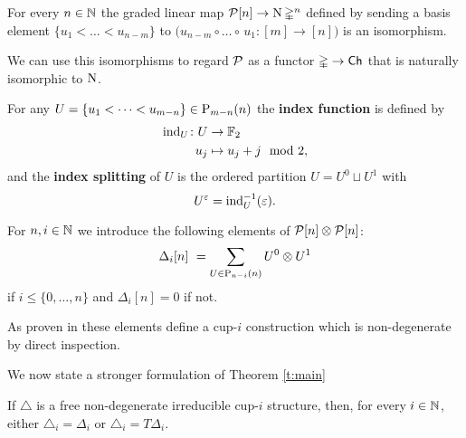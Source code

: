 \begin{lemma}
	For every $n \in \N$ the graded linear map $\cP[n] \to \chains \simplex^n$ defined by sending a basis element $\{u_1 < \dots < u_{n-m}\}$ to $\big( {u_{n-m}} \circ \dots \circ \, {u_1} \colon [m] \to [n] \big)$ is an isomorphism.
\end{lemma}

We can use this isomorphisms to regard $\cP$ as a functor $\simplex \to \Ch$ that is naturally isomorphic to $\chains$.

\begin{definition}
	For any $U = \{u_1 < \dots < u_{m-n}\} \in \P_{m-n}(n)$ the \textbf{index function} is defined by
	\[
	\begin{split}
	\ind_U \colon U &\to \F \\
	u_j &\mapsto u_j + j \mod 2,
	\end{split}
	\]
	and the \textbf{index splitting} of $U$ is the ordered partition $U = U^0 \sqcup U^1$ with
	\[
	U^\varepsilon = \ind_U^{-1}(\varepsilon).
	\]
\end{definition}

\begin{definition}
	For $n, i \in \N$ we introduce the following elements of $\cP[n] \ot \cP[n]$:
	\[
	\Delta_i [n] \ =
	\sum_{U \in \P_{n-i}(n)} {U^0} \ot {U^1}
	\]
	if $i \leq \{0, \dots, n\}$ and $\Delta_i [n] = 0$ if not.
\end{definition}

As proven in \cite{medina2021newformulas} these elements define a cup-$i$ construction which is non-degenerate by direct inspection.

We now state a stronger formulation of Theorem \ref{t:main}

\begin{theorem} \label{t:main reformulated}
	If $\triangle$ is a free non-degenerate irreducible cup-$i$ structure, then, for every $i \in \N$, either $\triangle_i = \Delta_i$ or $\triangle_i = T \Delta_i$.
\end{theorem}
